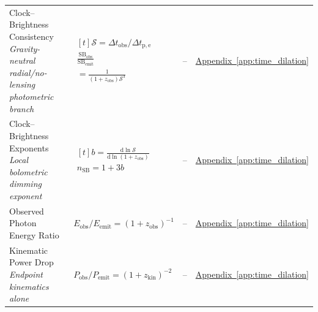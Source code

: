 \begin{longtable}{@{} p{4.5cm} p{6cm} c p{4cm} @{}}
{\raggedright Clock--Brightness Consistency \newline \textit{Gravity-neutral radial/no-lensing photometric branch}\par} & {\raggedright $\begin{gathered}[t]\mathcal S=\Delta t_{\mathrm{obs}}/\Delta t_{\mathrm{p,e}} \\ \frac{\mathrm{SB}_{\mathrm{obs}}}{\mathrm{SB}_{\mathrm{emit}}} \\ =\frac1{(1+z_{\mathrm{obs}})\mathcal S^3}\end{gathered}$\par} & -- & {\raggedright \hyperref[app:time_dilation]{Appendix~\ref*{app:time_dilation}}\par} \\

{\raggedright Clock--Brightness Exponents \newline \textit{Local bolometric dimming exponent}\par} & {\raggedright $\begin{gathered}[t]b=\frac{\mathrm d\ln\mathcal S}{\mathrm d\ln(1+z_{\mathrm{obs}})} \\ n_{\mathrm{SB}}=1+3b\end{gathered}$\par} & -- & {\raggedright \hyperref[app:time_dilation]{Appendix~\ref*{app:time_dilation}}\par} \\

{\raggedright Observed Photon Energy Ratio\par} & {\raggedright $E_{\mathrm{obs}}/E_{\mathrm{emit}}=(1+z_{\mathrm{obs}})^{-1}$\par} & -- & {\raggedright \hyperref[app:time_dilation]{Appendix~\ref*{app:time_dilation}}\par} \\

{\raggedright Kinematic Power Drop \newline \textit{Endpoint kinematics alone}\par} & {\raggedright $P_{\mathrm{obs}}/P_{\mathrm{emit}}=(1+z_{\mathrm{kin}})^{-2}$\par} & -- & {\raggedright \hyperref[app:time_dilation]{Appendix~\ref*{app:time_dilation}}\par} \\


\end{longtable}
